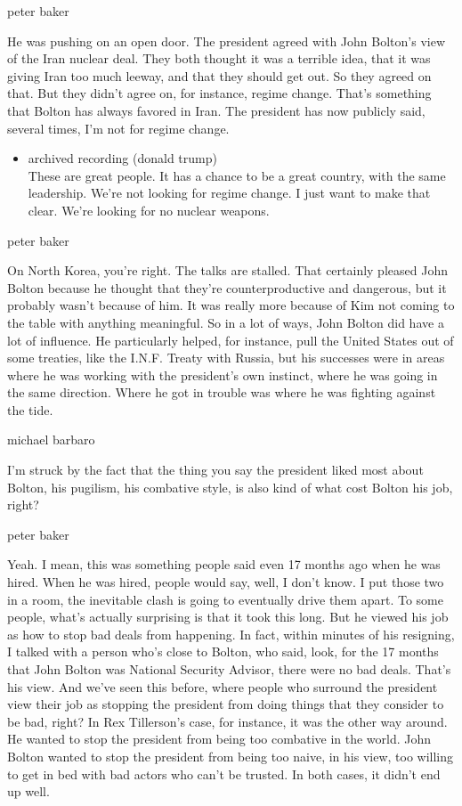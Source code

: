 peter baker

He was pushing on an open door. The president agreed with John Bolton's
view of the Iran nuclear deal. They both thought it was a terrible idea,
that it was giving Iran too much leeway, and that they should get out.
So they agreed on that. But they didn't agree on, for instance, regime
change. That's something that Bolton has always favored in Iran. The
president has now publicly said, several times, I'm not for regime
change.

\begin{itemize}
\tightlist
\item
  archived recording (donald trump)\\
  These are great people. It has a chance to be a great country, with
  the same leadership. We're not looking for regime change. I just want
  to make that clear. We're looking for no nuclear weapons.
\end{itemize}

peter baker

On North Korea, you're right. The talks are stalled. That certainly
pleased John Bolton because he thought that they're counterproductive
and dangerous, but it probably wasn't because of him. It was really more
because of Kim not coming to the table with anything meaningful. So in a
lot of ways, John Bolton did have a lot of influence. He particularly
helped, for instance, pull the United States out of some treaties, like
the I.N.F. Treaty with Russia, but his successes were in areas where he
was working with the president's own instinct, where he was going in the
same direction. Where he got in trouble was where he was fighting
against the tide.

michael barbaro

I'm struck by the fact that the thing you say the president liked most
about Bolton, his pugilism, his combative style, is also kind of what
cost Bolton his job, right?

peter baker

Yeah. I mean, this was something people said even 17 months ago when he
was hired. When he was hired, people would say, well, I don't know. I
put those two in a room, the inevitable clash is going to eventually
drive them apart. To some people, what's actually surprising is that it
took this long. But he viewed his job as how to stop bad deals from
happening. In fact, within minutes of his resigning, I talked with a
person who's close to Bolton, who said, look, for the 17 months that
John Bolton was National Security Advisor, there were no bad deals.
That's his view. And we've seen this before, where people who surround
the president view their job as stopping the president from doing things
that they consider to be bad, right? In Rex Tillerson's case, for
instance, it was the other way around. He wanted to stop the president
from being too combative in the world. John Bolton wanted to stop the
president from being too naive, in his view, too willing to get in bed
with bad actors who can't be trusted. In both cases, it didn't end up
well.


